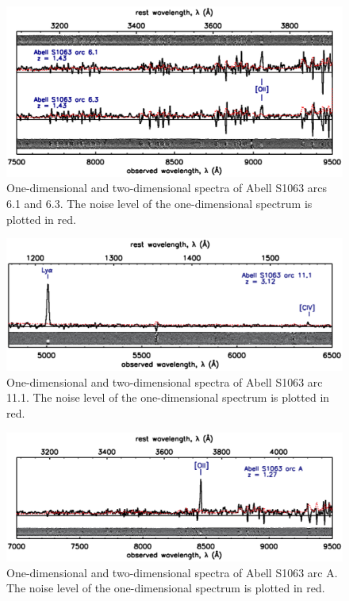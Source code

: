 \newpage
\begin{figure}[h]
\includegraphics[width=\textwidth]{Chap2/c2f13.eps}
\caption[Abell S1063 arcs 6.1 and 6.3]{One-dimensional and two-dimensional spectra of Abell S1063 arcs 6.1 and 6.3. The noise level of the one-dimensional spectrum is plotted in red.}
\label{app:fig:as1063_spec6}
\end{figure}

\begin{figure}[h]
\includegraphics[width=\textwidth]{Chap2/c2f14.eps}
\caption[Abell S1063 arc 11.1 spectrum]{One-dimensional and two-dimensional spectra of Abell S1063 arc 11.1. The noise level of the one-dimensional spectrum is plotted in red.}
\label{app:fig:as1063_spec11_1}
\end{figure}

\begin{figure}[h]
\includegraphics[width=\textwidth]{Chap2/c2f15.eps}
\caption[Abell S1063 arc A spectrum]{One-dimensional and two-dimensional spectra of Abell S1063 arc A. The noise level of the one-dimensional spectrum is plotted in red.}
\label{app:fig:as1063_specA}
\end{figure}

